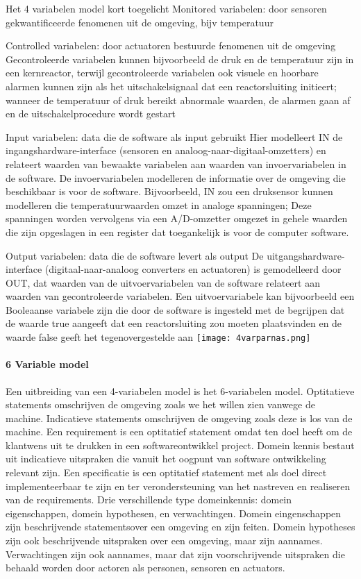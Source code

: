 \documentclass{article}
\begin{document}
	Het 4 variabelen model kort toegelicht
	Monitored variabelen: door sensoren gekwantificeerde fenomenen uit de omgeving, bijv temperatuur
	
	Controlled variabelen: door actuatoren bestuurde fenomenen uit de omgeving
	Gecontroleerde variabelen kunnen bijvoorbeeld de druk en de temperatuur zijn
	in een kernreactor, terwijl gecontroleerde variabelen ook visuele en hoorbare alarmen kunnen zijn
	als het uitschakelsignaal dat een reactorsluiting initieert; wanneer de temperatuur of druk bereikt
	abnormale waarden, de alarmen gaan af en de uitschakelprocedure wordt gestart
	
	Input variabelen: data die de software als input gebruikt
	Hier modelleert IN de ingangshardware-interface (sensoren en analoog-naar-digitaal-omzetters) en
	relateert waarden van bewaakte variabelen aan waarden van invoervariabelen in de software. De invoervariabelen modelleren de informatie over de omgeving die beschikbaar is voor de software. Bijvoorbeeld,
	IN zou een druksensor kunnen modelleren die temperatuurwaarden omzet in analoge spanningen; Deze spanningen worden vervolgens via een A/D-omzetter omgezet in gehele waarden die zijn opgeslagen in een register dat toegankelijk is voor de computer
	software.
	
	Output variabelen: data die de software levert als output
	De uitgangshardware-interface (digitaal-naar-analoog converters en actuatoren) is gemodelleerd
	door OUT, dat waarden van de uitvoervariabelen van de software relateert aan waarden van gecontroleerde variabelen. Een uitvoervariabele kan bijvoorbeeld een Booleaanse variabele zijn die door de software is ingesteld met de
	begrijpen dat de waarde true aangeeft dat een reactorsluiting zou moeten plaatsvinden en de waarde
	false geeft het tegenovergestelde aan
	\texttt{[image: 4varparnas.png]}
	
	\paragraph{6 Variable model}
	Een uitbreiding van een 4-variabelen model is het 6-variabelen model.
	Optitatieve statements omschrijven de omgeving zoals we het willen zien vanwege de machine. 
	Indicatieve statements omschrijven de omgeving zoals deze is los van de machine. 
	Een requirement is een optitatief statement omdat ten doel heeft om de klantwens uit te drukken in een softwareontwikkel project. 
	Domein kennis bestaut uit indicatieve uitspraken die vanuit het oogpunt van software ontwikkeling relevant zijn. 
	Een specificatie is een optitatief statement met als doel direct implementeerbaar te zijn en ter verondersteuning van het nastreven en realiseren van de requirements. 
	Drie verschillende type domeinkennis: domein eigenschappen, domein hypothesen, en verwachtingen. 
	Domein eingenschappen  zijn beschrijvende statementsover een omgeving en zijn feiten. Domein hypotheses  zijn ook beschrijvende uitspraken over een omgeving, maar zijn aannames. 
	Verwachtingen zijn ook aannames, maar dat zijn voorschrijvende uitspraken die behaald worden door actoren als personen, sensoren en actuators. 
	
\end{document}
